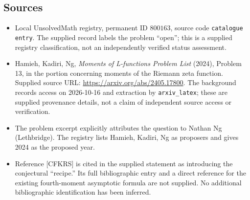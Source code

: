 \documentclass[11pt]{article}
\begin{document}
\subsection{Sources}
\begin{itemize}
\item Local UnsolvedMath registry, permanent ID \(800163\), source code \texttt{catalogue entry}. The supplied record labels the problem ``open''; this is a supplied registry classification, not an independently verified status assessment.
\item Hamieh, Kadiri, Ng, \emph{Moments of L-functions Problem List} (2024), Problem 13, in the portion concerning moments of the Riemann zeta function. Supplied source URL: \url{https://arxiv.org/abs/2405.17800}. The background records access on 2026-10-16 and extraction by \texttt{arxiv\_latex}; these are supplied provenance details, not a claim of independent source access or verification.
\item The problem excerpt explicitly attributes the question to Nathan Ng (Lethbridge). The registry lists Hamieh, Kadiri, Ng as proposers and gives 2024 as the proposed year.
\item Reference [CFKRS] is cited in the supplied statement as introducing the conjectural ``recipe.'' Its full bibliographic entry and a direct reference for the existing fourth-moment asymptotic formula are not supplied. No additional bibliographic identification has been inferred.
\end{itemize}
\end{document}
